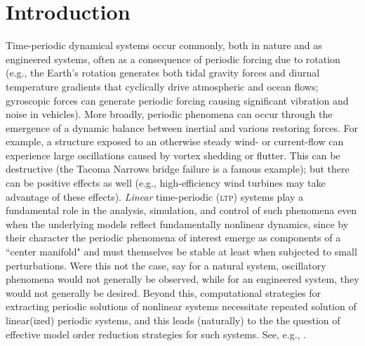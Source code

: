 \documentclass[pdflatex,sn-mathphys-num]{sn-jnl}%
\theoremstyle{thmstyleone}%
\theoremstyle{thmstyletwo}%
\theoremstyle{thmstylethree}%
\begin{document}


\maketitle

\section{Introduction}\label{intro}

Time-periodic dynamical systems occur commonly, both in nature and as engineered systems, often as a consequence of periodic forcing due to rotation (e.g., the Earth's rotation generates both tidal gravity forces and diurnal temperature gradients that cyclically drive atmospheric and ocean flows;  gyroscopic forces can generate periodic forcing causing significant vibration and noise in vehicles).   
More broadly, periodic phenomena can occur through the emergence of a dynamic balance between inertial and various restoring forces.  For example, a structure exposed to an otherwise steady wind- or current-flow can experience large oscillations caused by vortex shedding or flutter.  This can be destructive (the Tacoma Narrows bridge failure is a famous example); but there can be positive effects as well (e.g., high-efficiency wind turbines may take advantage of these effects).  \emph{Linear} time-periodic (\textsc{ltp}) systems play a fundamental role in the analysis, simulation, and control of such phenomena even when the underlying models reflect fundamentally nonlinear dynamics, since by their character the periodic phenomena of interest emerge as components of a ``center manifold" and must themselves be stable at least when subjected to small perturbations.  Were this not the case, say for a natural system, oscillatory phenomena would not generally be observed, while for an engineered system, they would not generally be desired.   Beyond this, computational strategies for extracting periodic solutions of nonlinear systems necessitate repeated solution of linear(ized) periodic systems, and this leads (naturally) to the the question of effective model order reduction strategies for such systems. See, e.g., \cite{bittantiZeroDynamicsHelicopter1996,gazzolaTacoma2022,OutOfControl200}.
\end{document}
